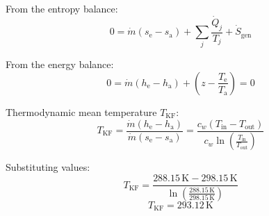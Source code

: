 From the entropy balance:  
\[
0 = \dot{m} \left( s_{\text{e}} - s_{\text{a}} \right) + \sum_j \frac{\dot{Q}_j}{T_j} + \dot{S}_{\text{gen}}
\]  

From the energy balance:  
\[
0 = \dot{m} \left( h_{\text{e}} - h_{\text{a}} \right) + \left( z - \frac{T_{\text{e}}}{T_{\text{a}}} \right) = 0
\]  

Thermodynamic mean temperature \( T_{\text{KF}} \):  
\[
T_{\text{KF}} = \frac{\dot{m} \left( h_{\text{e}} - h_{\text{a}} \right)}{\dot{m} \left( s_{\text{e}} - s_{\text{a}} \right)} = \frac{c_w \left( T_{\text{in}} - T_{\text{out}} \right)}{c_w \ln \left( \frac{T_{\text{in}}}{T_{\text{out}}} \right)}
\]  

Substituting values:  
\[
T_{\text{KF}} = \frac{288.15 \, \text{K} - 298.15 \, \text{K}}{\ln \left( \frac{288.15 \, \text{K}}{298.15 \, \text{K}} \right)}
\]  
\[
T_{\text{KF}} = 293.12 \, \text{K}
\]